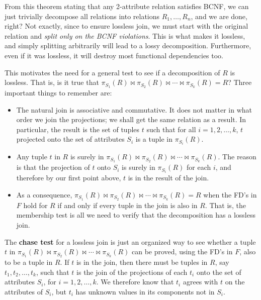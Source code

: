\documentclass{article}
\begin{document}
    From this theorem stating that any 2-attribute relation satisfies BCNF, we can just trivially decompose all relations into relations $R_1, \ldots, R_n$, and we are done, right? Not exactly, since to ensure lossless join, we must start with the original relation and \textit{split only on the BCNF violations}. This is what makes it lossless, and simply splitting arbitrarily will lead to a lossy decomposition. Furthermore, even if it was lossless, it will destroy most functional dependencies too. 

    This motivates the need for a general test to see if a decomposition of $R$ is lossless. That is, is it true that $\pi_{S_1}(R) \bowtie \pi_{S_2}(R) \bowtie \cdots \bowtie \pi_{S_k}(R) = R$? Three important things to remember are:

    \begin{itemize}
      \item The natural join is associative and commutative. It does not matter in what order we join the projections; we shall get the same relation as a result. In particular, the result is the set of tuples $t$ such that for all $i = 1, 2, \ldots, k$, $t$ projected onto the set of attributes $S_i$ is a tuple in $\pi_{S_i}(R)$.
      
      \item Any tuple $t$ in $R$ is surely in $\pi_{S_1}(R) \bowtie \pi_{S_2}(R) \bowtie \cdots \bowtie \pi_{S_k}(R)$. The reason is that the projection of $t$ onto $S_i$ is surely in $\pi_{S_i}(R)$ for each $i$, and therefore by our first point above, $t$ is in the result of the join.
      
      \item As a consequence, $\pi_{S_1}(R) \bowtie \pi_{S_2}(R) \bowtie \cdots \bowtie \pi_{S_k}(R) = R$ when the FD's in $F$ hold for $R$ if and only if every tuple in the join is also in $R$. That is, the membership test is all we need to verify that the decomposition has a lossless join.
    \end{itemize}

    \begin{theorem}
      The \textbf{chase test} for a lossless join is just an organized way to see whether a tuple $t$ in $\pi_{S_1}(R) \bowtie \pi_{S_2}(R) \bowtie \cdots \bowtie \pi_{S_k}(R)$ can be proved, using the FD's in $F$, also to be a tuple in $R$. If $t$ is in the join, then there must be tuples in $R$, say $t_1, t_2, \ldots, t_k$, such that $t$ is the join of the projections of each $t_i$ onto the set of attributes $S_i$, for $i = 1,2,\ldots,k$. We therefore know that $t_i$ agrees with $t$ on the attributes of $S_i$, but $t_i$ has unknown values in its components not in $S_i$.
    \end{theorem}
\end{document}
